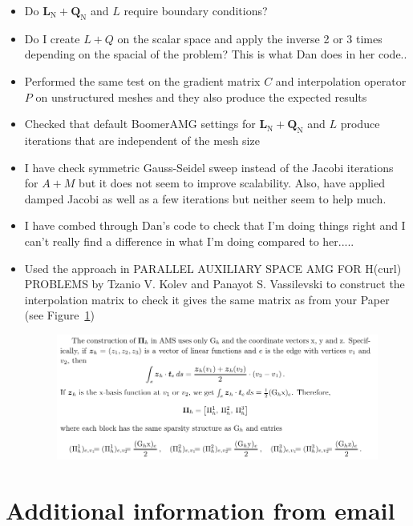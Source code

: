 \documentclass{article}
\begin{document}
\begin{itemize}
    \item Do $\textbf{L}_{\mbox{N}}+\textbf{Q}_{\mbox{N}}$ and $L$ require boundary conditions?
    \item Do I create $L+Q$ on the scalar space and apply the inverse 2 or 3 times depending on the spacial of the problem? This is what Dan does in her code..
    \item Performed the same test on the gradient matrix $C$ and interpolation operator $P$ on unstructured meshes and they also produce the expected results
    \item Checked that default BoomerAMG settings for $\textbf{L}_{\mbox{N}}+\textbf{Q}_{\mbox{N}}$ and $L$ produce iterations that are independent of the mesh size
    \item I have check symmetric Gauss-Seidel sweep instead of the Jacobi iterations for $A+M$ but it does not seem to improve scalability. Also, have applied damped Jacobi as well as a few iterations but neither seem to help much.
    \item I have combed through Dan's code to check that I'm doing things right and I can't really find a difference in what I'm doing compared to her.....
    \item Used the approach in PARALLEL AUXILIARY SPACE AMG FOR H(curl) PROBLEMS by Tzanio V. Kolev and Panayot S. Vassilevski to construct the interpolation matrix to check it gives the same matrix as from your Paper (see Figure~\ref{fig:in})
    \begin{figure}[h!]
    \centering
    \includegraphics[width=1\textwidth]{Figures/InterpolationConstruct.png}
    \caption{}
    \label{fig:in}
\end{figure}
\end{itemize}





\newpage

\section*{Additional information from email}
\end{document}
